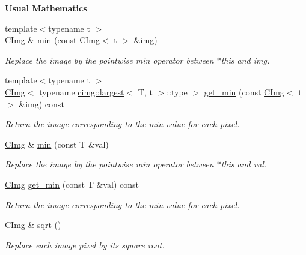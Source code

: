 \begin{Indent}{\bf Usual Mathematics}
\begin{DoxyCompactItemize}
{\footnotesize template$<$typename t $>$ }\\\hyperlink{structcimg__library_1_1_c_img}{CImg} \& \hyperlink{structcimg__library_1_1_c_img_a34e7c2c9e580530258488afa45df57c0}{min} (const \hyperlink{structcimg__library_1_1_c_img}{CImg}$<$ t $>$ \&img)
\begin{DoxyCompactList}\small\item\em Replace the image by the pointwise min operator between {\ttfamily $\ast$this} and {\ttfamily img}. \item\end{DoxyCompactList}\item 
{\footnotesize template$<$typename t $>$ }\\\hyperlink{structcimg__library_1_1_c_img}{CImg}$<$ typename \hyperlink{structcimg__library_1_1cimg_1_1largest}{cimg::largest}$<$ T, t $>$::type $>$ \hyperlink{structcimg__library_1_1_c_img_a53a47ce31e51e1a0812e5ba25b49c77b}{get\_\-min} (const \hyperlink{structcimg__library_1_1_c_img}{CImg}$<$ t $>$ \&img) const 
\begin{DoxyCompactList}\small\item\em Return the image corresponding to the min value for each pixel. \item\end{DoxyCompactList}\item 
\hyperlink{structcimg__library_1_1_c_img}{CImg} \& \hyperlink{structcimg__library_1_1_c_img_af0c2954233976adbbf4ff80862d2e455}{min} (const T \&val)
\begin{DoxyCompactList}\small\item\em Replace the image by the pointwise min operator between {\ttfamily $\ast$this} and {\ttfamily val}. \item\end{DoxyCompactList}\item 
\hyperlink{structcimg__library_1_1_c_img}{CImg} \hyperlink{structcimg__library_1_1_c_img_a7acd104b13e4a30b13aafe1fd01c562c}{get\_\-min} (const T \&val) const 
\begin{DoxyCompactList}\small\item\em Return the image corresponding to the min value for each pixel. \item\end{DoxyCompactList}\item 
\hyperlink{structcimg__library_1_1_c_img}{CImg} \& \hyperlink{structcimg__library_1_1_c_img_aacf6f18af147ad1167dd4abf01381d37}{sqrt} ()
\begin{DoxyCompactList}\small\item\em Replace each image pixel by its square root. \item\end{DoxyCompactList}\item 

\end{DoxyCompactItemize}
\end{Indent}
